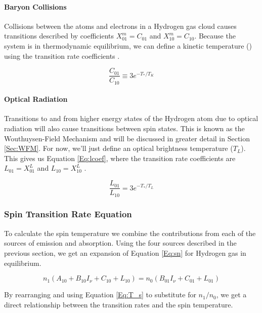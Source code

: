 \paragraph{Baryon Collisions}

Collisions between the atoms and electrons in a Hydrogen gas cloud causes transitions described by coefficients $X^m_{01} = C_{01}$ and $X^m_{10} = C_{10}$. Because the system is in thermodynamic equilibrium, we can define a kinetic temperature (\tk) using the transition rate coefficients \cite{field_1958}. 

\begin{equation}
\frac{C_{01}}{C_{10}} \equiv 3 e^{-T_*/T_K}
\end{equation}

\paragraph{Optical Radiation}

Transitions to and from higher energy states  of the Hydrogen atom due to optical radiation will also cause transitions between spin states. This is known as the Wouthuysen-Field Mechanism \cite{wouthuysen_1952}\cite{field_1958} and will be discussed in greater detail in Section \ref{Sec:WFM}. For now, we'll just define an optical brightness temperature ($T_L$). This gives us Equation \ref{Eq:lcoef}, where the transition rate coefficients are $L_{01} = X^L_{01}$ and $L_{10} = X^L_{10}$ \cite{field_1958}. 

\begin{equation} \label{Eq:lcoef}
\frac{L_{01}}{L_{10}} = 3 e^{-T_*/T_L}
\end{equation}

\subsubsection{Spin Transition Rate Equation}

To calculate the spin temperature we combine the contributions from each of the sources of emission and absorption. Using the four sources described in the previous section, we get an expansion of Equation \ref{Eq:sn} for Hydrogen gas in equilibrium.

\begin{equation}\label{Eq:sns}
n_1(A_{10} + B_{10} I_\nu + C_{10} + L_{10}) = n_0 (B_{01} I_\nu + C_{01} + L_{01})
\end{equation}

By rearranging and using Equation \ref{Eq:T_s} to substitute for $n_1/n_0$, we get a direct relationship between the transition rates and the spin temperature. 

